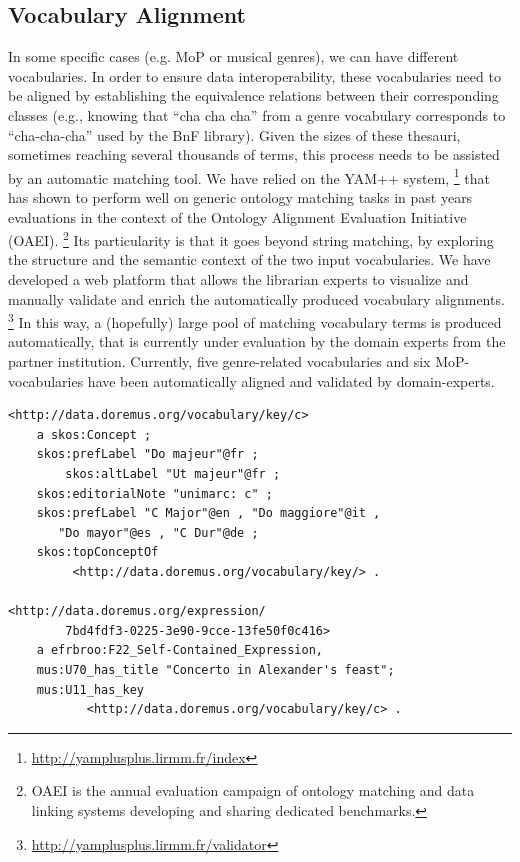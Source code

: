\subsection{Vocabulary Alignment}
In some specific cases (e.g. MoP or musical genres), we can have different vocabularies. In order to ensure data interoperability, these vocabularies need to be aligned by establishing the equivalence relations between their corresponding classes (e.g., knowing that ``cha cha cha'' from a genre vocabulary corresponds to ``cha-cha-cha'' used by the BnF library). Given the sizes of these thesauri, sometimes reaching several thousands of terms, this process needs to be assisted by an automatic matching tool. We have relied on the YAM++ system, \footnote{\url{http://yamplusplus.lirmm.fr/index}} that has shown to perform well on generic ontology matching tasks in past years  evaluations in the context of the Ontology Alignment Evaluation Initiative (OAEI). \footnote{OAEI is the annual evaluation campaign of ontology matching and data linking systems developing and sharing dedicated benchmarks.} Its particularity is that it goes beyond string matching, by exploring the structure and the semantic context of the two input vocabularies. We have developed a web platform that allows the librarian experts to visualize and manually validate and enrich the automatically produced vocabulary alignments. \footnote{\url{http://yamplusplus.lirmm.fr/validator}} In this way, a (hopefully) large pool of matching vocabulary terms is produced automatically, that is currently under evaluation by the domain experts from the partner institution. Currently, five genre-related vocabularies and six MoP-vocabularies have been automatically aligned and validated by domain-experts.

\begin{lstlisting}[captionpos=b, caption=Definition and usage of a vocabulary concept, label=lst:skos, basicstyle=\footnotesize\ttfamily,frame=single]
<http://data.doremus.org/vocabulary/key/c>
    a skos:Concept ;
	skos:prefLabel "Do majeur"@fr ;
        skos:altLabel "Ut majeur"@fr ;
	skos:editorialNote "unimarc: c" ;
	skos:prefLabel "C Major"@en , "Do maggiore"@it ,
	   "Do mayor"@es , "C Dur"@de ;
	skos:topConceptOf
	     <http://data.doremus.org/vocabulary/key/> .
	   
<http://data.doremus.org/expression/
        7bd4fdf3-0225-3e90-9cce-13fe50f0c416> 
    a efrbroo:F22_Self-Contained_Expression,
    mus:U70_has_title "Concerto in Alexander's feast";
    mus:U11_has_key
           <http://data.doremus.org/vocabulary/key/c> .
\end{lstlisting}

